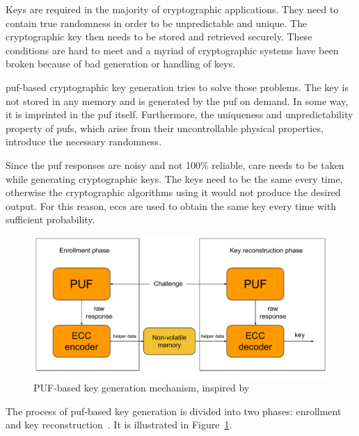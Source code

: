 Keys are required in the majority of cryptographic applications. They need to contain true randomness in order to be unpredictable and unique. The cryptographic key then needs to be stored and retrieved securely. These conditions are hard to meet and a myriad of cryptographic systems have been broken because of bad generation or handling of keys.~\cite{Maes2012_2}

\gls{puf}-based cryptographic key generation tries to solve those problems. The key is not stored in any memory and is generated by the \gls{puf} on demand. In some way, it is imprinted in the \gls{puf} itself. Furthermore, the uniqueness and unpredictability property of \glspl{puf}, which arise from their uncontrollable physical properties, introduce the necessary randomness.

Since the \gls{puf} responses are noisy and not 100\% reliable, care needs to be taken while generating cryptographic keys. The keys need to be the same every time, otherwise the cryptographic algorithms using it would not produce the desired output. For this reason, \glspl{ecc} are used to obtain the same key every time with sufficient probability.

\begin{figure}[h!]
    \centering
    \captionsetup{justification=centering,margin=0.5cm}
    \includegraphics[width=\textwidth]{images/key_generation.pdf}
    \caption[PUF-based key generation mechanism]{PUF-based key generation mechanism, inspired by~\cite{Gao2017}}
    \label{fig:key_generation}
\end{figure}

The process of \gls{puf}-based key generation is divided into two phases: enrollment and key reconstruction~\cite{Mispan2018}. It is illustrated in Figure~\ref{fig:key_generation}.

